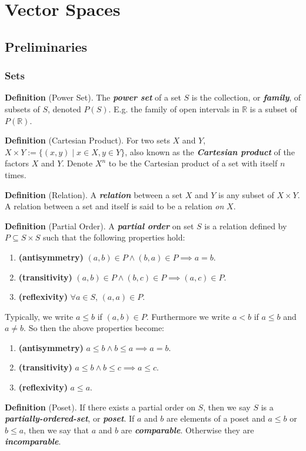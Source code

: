 \section{Vector Spaces}
\subsection{Preliminaries}
\subsubsection{Sets}
\textbf{Definition} (Power Set). The \textbf{\textit{power set}} of a set $S$ is the collection, or \textbf{\textit{family}}, of subsets of $S$, denoted $P(S)$. E.g. the family of open intervals in $\mathbb{R}$ is a subset of $P(\mathbb{R})$.

\textbf{Definition} (Cartesian Product). For two sets $X$ and $Y$, $X\times Y:=\{(x,y)\mid x\in X, y\in Y\}$, also known as the \textbf{\textit{Cartesian product}} of the factors $X$ and $Y$. Denote $X^n$ to be the Cartesian product of a set with itself $n$ times.

\textbf{Definition} (Relation). A \textbf{\textit{relation}} between a set $X$ and $Y$ is any subset of $X\times Y$. A relation between a set and itself is said to be a relation \textit{on} $X$. 

\textbf{Definition} (Partial Order). A \textbf{\textit{partial order}} on set $S$ is a relation defined by $P\subseteq S\times S$ such that the following properties hold:
\begin{enumerate}
    \item \textbf{(antisymmetry)} $(a,b)\in P\wedge(b,a)\in P\implies a=b$.
    \item \textbf{(transitivity)} $(a,b)\in P\wedge(b,c)\in P\implies(a,c)\in P$.
    \item \textbf{(reflexivity)} $\forall a\in S$, $(a,a)\in P$.
\end{enumerate}
Typically, we write $a\leq b$ if $(a,b)\in P$. Furthermore we write $a<b$ if $a\leq b$ and $a\neq b$. So then the above properties become:
\begin{enumerate}
    \item \textbf{(antisymmetry)} $a\leq b\wedge b\leq a\implies a=b$.
    \item \textbf{(transitivity)} $a\leq b\wedge b\leq c\implies a\leq c$.
    \item \textbf{(reflexivity)} $a\leq a$.
\end{enumerate}
\textbf{Definition} (Poset). If there exists a partial order on $S$, then we say $S$ is a \textbf{\textit{partially-ordered-set}}, or \textbf{\textit{poset}}. If $a$ and $b$ are elements of a poset and $a\leq b$ or $b\leq a$, then we say that $a$ and $b$ are \textbf{\textit{comparable}}. Otherwise they are \textbf{\textit{incomparable}}.

